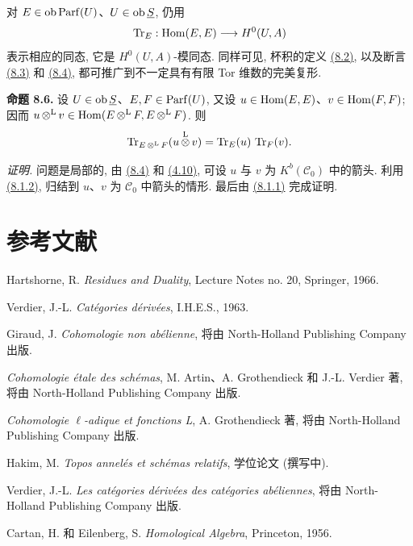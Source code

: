 对 \(E\in\operatorname{ob}\operatorname{Parf}(U)\)、\(U\in\operatorname{ob}\underline S\), 仍用
\[
  \operatorname{Tr}_E:\operatorname{Hom}(E,E)\longrightarrow H^0(U,A)
\]
表示相应的同态, 它是 \(H^0(U,A)\)-模同态. 同样可见, 杯积的定义 \hyperlink{sga6.e01.para.8-2}{(8.2)}, 以及断言 \hyperlink{sga6.e01.prop.8-3}{(8.3)} 和 \hyperlink{sga6.e01.cor.8-4}{(8.4)}, 都可推广到不一定具有有限 Tor 维数的完美复形.

\textbf{命题 8.6.} 设 \(U\in\operatorname{ob}\underline S\)、\(E,F\in\operatorname{Parf}(U)\), 又设 \(u\in\operatorname{Hom}(E,E)\)、\(v\in\operatorname{Hom}(F,F)\); 因而 \(u\mathop{\otimes}^{\mathrm L} v\in\operatorname{Hom}(E\mathop{\otimes}^{\mathrm L} F,E\mathop{\otimes}^{\mathrm L} F)\). 则
\[
  \operatorname{Tr}_{E\mathop{\otimes}^{\mathrm L} F}(u\mathop{\otimes}^{\mathrm L} v)=\operatorname{Tr}_E(u)\,\operatorname{Tr}_F(v).
\]

\emph{证明.} 问题是局部的, 由 \hyperlink{sga6.e01.cor.8-4}{(8.4)} 和 \hyperlink{sga6.e01.prop.4-10}{(4.10)}, 可设 \(u\) 与 \(v\) 为 \(K^b(\mathcal C_0)\) 中的箭头. 利用 \hyperlink{sga6.e01.para.8-1-2}{(8.1.2)}, 归结到 \(u\)、\(v\) 为 \(\mathcal C_0\) 中箭头的情形. 最后由 \hyperlink{sga6.e01.para.8-1-1}{(8.1.1)} 完成证明.

\section*{参考文献}
\begin{description}[leftmargin=2.5cm,style=nextline]
\item[{[H]}] Hartshorne, R. \emph{Residues and Duality}, Lecture Notes no. 20, Springer, 1966.
\item[{[V]}] Verdier, J.-L. \emph{Catégories dérivées}, I.H.E.S., 1963.
\item[{[G]}] Giraud, J. \emph{Cohomologie non abélienne}, 将由 North-Holland Publishing Company 出版.
\item[{SGA 4}] \emph{Cohomologie étale des schémas}, M. Artin、A. Grothendieck 和 J.-L. Verdier 著, 将由 North-Holland Publishing Company 出版.
\item[{SGA 5}] \emph{Cohomologie \(\ell\)-adique et fonctions L}, A. Grothendieck 著, 将由 North-Holland Publishing Company 出版.
\item[{[1]}] Hakim, M. \emph{Topos annelés et schémas relatifs}, 学位论文 (撰写中).
\item[{[2]}] Verdier, J.-L. \emph{Les catégories dérivées des catégories abéliennes}, 将由 North-Holland Publishing Company 出版.
\item[{[MULT]}] Cartan, H. 和 Eilenberg, S. \emph{Homological Algebra}, Princeton, 1956.
\end{description}



